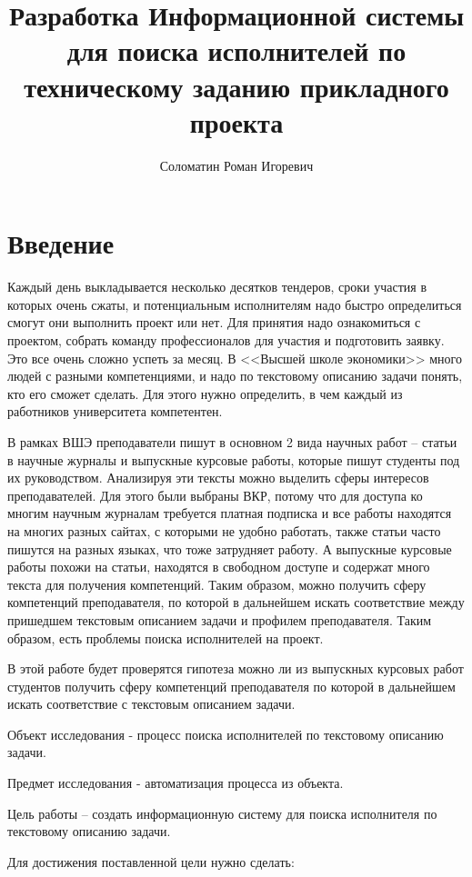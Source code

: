 \documentclass[PI,KR]{HSEUniversity}
\title{Разработка Информационной системы для поиска исполнителей по техническому заданию прикладного проекта}
\author{Соломатин Роман Игоревич}
\begin{document}
\maketitle

\chapter*{Введение}

Каждый день выкладывается несколько десятков тендеров, сроки участия в которых очень сжаты, и потенциальным исполнителям надо быстро определиться смогут они выполнить проект или нет. Для принятия надо ознакомиться с проектом, собрать команду профессионалов для участия и подготовить заявку. Это все очень сложно успеть за месяц. В <<Высшей школе экономики>> много людей с разными компетенциями, и надо по текстовому описанию задачи понять, кто его сможет сделать. Для этого нужно определить, в чем каждый из работников университета компетентен. 

В рамках ВШЭ преподаватели пишут в основном 2 вида научных работ -- статьи в научные журналы и выпускные курсовые работы, которые пишут студенты под их руководством. Анализируя эти тексты можно выделить сферы интересов преподавателей. Для этого были выбраны ВКР, потому что для доступа ко многим научным журналам требуется платная подписка и все работы находятся на многих разных сайтах, с которыми не удобно работать, также статьи часто пишутся на разных языках, что тоже затрудняет работу. А выпускные курсовые работы похожи на статьи, находятся в свободном доступе и содержат много текста для получения компетенций. Таким образом, можно получить сферу компетенций преподавателя, по которой в дальнейшем искать соответствие между пришедшем текстовым описанием задачи и профилем преподавателя. Таким образом, есть проблемы поиска исполнителей на проект. 

В этой работе будет проверятся гипотеза можно ли из выпускных курсовых работ студентов получить сферу компетенций преподавателя по которой в дальнейшем искать соответствие с текстовым описанием задачи.

Объект исследования - процесс поиска исполнителей по текстовому описанию задачи.

Предмет исследования - автоматизация процесса из объекта.

Цель работы – создать информационную систему для поиска исполнителя по текстовому описанию задачи.

Для достижения поставленной цели нужно сделать:
\end{document}
